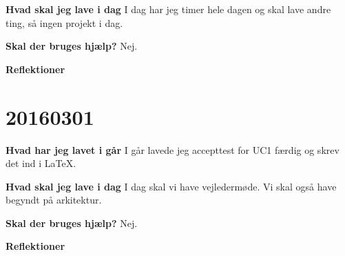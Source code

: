 \documentclass{article}
\begin{document}
	\textbf{Hvad skal jeg lave i dag}
	I dag har jeg timer hele dagen og skal lave andre ting, så ingen projekt i dag. 
	
	\textbf{Skal der bruges hjælp?}
	Nej. 

	\textbf{Reflektioner}


	\section{20160301}

	\textbf{Hvad har jeg lavet i går}
	I går lavede jeg accepttest for UC1 færdig og skrev det ind i LaTeX. 

	\textbf{Hvad skal jeg lave i dag}
	I dag skal vi have vejledermøde. Vi skal også have begyndt på arkitektur. 

	\textbf{Skal der bruges hjælp?}
	Nej. 

	\textbf{Reflektioner}
\end{document}
